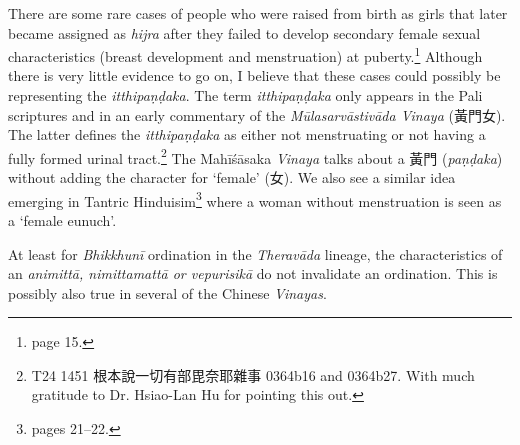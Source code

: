 There are some rare cases of people who were raised from birth as girls that later became assigned as {\em hijra} after they failed to develop secondary female sexual characteristics (breast development and menstruation) at puberty.\footnote{\cite{nanda} page 15.} Although there is very little evidence to go on, I believe that these cases could possibly be representing the {\em itthipaṇḍaka}. The term {\em itthipaṇḍaka} only appears in the Pali scriptures and in an early commentary of the {\em Mūlasarvāstivāda Vinaya} (黃門女). The latter defines the {\em itthipaṇḍaka} as either not menstruating or not having a fully formed urinal tract.\footnote{T24 1451 根本說一切有部毘奈耶雜事 0364b16 and 0364b27. With much gratitude to Dr. Hsiao-Lan Hu for pointing this out.} The Mahīśāsaka {\em Vinaya} talks about a 黃門 ({\em paṇḍaka}) without adding the character for `female' (女). We also see a similar idea emerging in Tantric Hinduisim\footnote{\cite{nanda} pages 21–22.} where a woman without menstruation is seen as a `female eunuch'.

At least for {\em Bhikkhunī} ordination in the {\em Theravāda} lineage, the characteristics of an {\em animittā, nimittamattā or vepurisikā} do not invalidate an ordination. This is possibly also true in several of the Chinese {\em Vinayas}.
